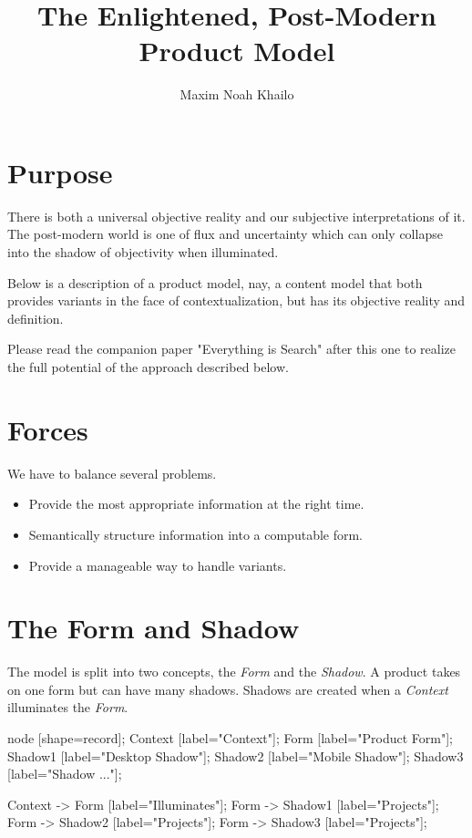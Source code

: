 \documentclass[11pt]{article}
\title{The Enlightened, Post-Modern Product Model}
\author{Maxim Noah Khailo}
\begin{document}
\maketitle
\section{Purpose}

There is both a universal objective reality and our subjective interpretations of 
it. The post-modern world is one of flux and uncertainty which can only collapse
into the shadow of objectivity when illuminated. 

Below is a description of a product model, nay, a content model that both provides
variants in the face of contextualization, but has its objective reality and definition.

Please read the companion paper "Everything is Search" after this one to realize
the full potential of the approach described below.

\section{Forces}

We have to balance several problems.

\begin{itemize}
    \item Provide the most appropriate information at the right time.
    \item Semantically structure information into a computable form.
    \item Provide a manageable way to handle variants.
\end{itemize}

\newpage
\section{The Form and Shadow}

The model is split into two concepts, the \emph{Form} and the \emph{Shadow}. 
A product takes on one form but can have many shadows. Shadows are created when
a \emph{Context} illuminates the \emph{Form}.

 {
    node [shape=record];
    Context [label="Context"];
    Form [label="Product Form"];
    Shadow1 [label="Desktop Shadow"];
    Shadow2 [label="Mobile Shadow"];
    Shadow3 [label="Shadow ..."];

    Context -> Form [label="Illuminates"];
    Form -> Shadow1 [label="Projects"];
    Form -> Shadow2 [label="Projects"];
    Form -> Shadow3 [label="Projects"];
}
\end{document}
